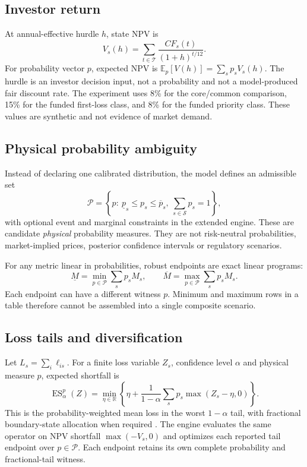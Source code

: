 \documentclass[11pt,a4paper]{article}
\begin{document}
\subsection{Investor return}

At annual-effective hurdle \(h\), state NPV is
\begin{equation}
V_s(h)=\sum_{t\in\mathcal T}\frac{CF_s(t)}{(1+h)^{t/12}}.
\label{eq:npv}
\end{equation}
For probability vector \(p\), expected NPV is \(\mathbb E_p[V(h)]=\sum_s p_sV_s(h)\). The hurdle is an investor decision input, not a probability and not a model-produced fair discount rate. The experiment uses 8\% for the core/common comparison, 15\% for the funded first-loss class, and 8\% for the funded priority class. These values are synthetic and not evidence of market demand.

\subsection{Physical probability ambiguity}

Instead of declaring one calibrated distribution, the model defines an admissible set
\begin{equation}
\mathcal P=\left\{p:\ \underline p_s\le p_s\le\overline p_s,\ \sum_{s\in\mathcal S}p_s=1\right\},
\label{eq:polytope}
\end{equation}
with optional event and marginal constraints in the extended engine. These are candidate \emph{physical} probability measures. They are not risk-neutral probabilities, market-implied prices, posterior confidence intervals or regulatory scenarios.

For any metric linear in probabilities, robust endpoints are exact linear programs:
\begin{equation}
\underline M=\min_{p\in\mathcal P}\sum_s p_sM_s,
\qquad
\overline M=\max_{p\in\mathcal P}\sum_s p_sM_s.
\end{equation}
Each endpoint can have a different witness \(p\). Minimum and maximum rows in a table therefore cannot be assembled into a single composite scenario.

\subsection{Loss tails and diversification}

Let \(L_s=\sum_i\ell_{is}\). For a finite loss variable \(Z_s\), confidence level \(\alpha\) and physical measure \(p\), expected shortfall is
\begin{equation}
\operatorname{ES}^{p}_{\alpha}(Z)
=\min_{\eta\in\mathbb R}\left\{\eta+\frac{1}{1-\alpha}
\sum_s p_s\max(Z_s-\eta,0)\right\}.
\label{eq:es}
\end{equation}
This is the probability-weighted mean loss in the worst \(1-\alpha\) tail, with fractional boundary-state allocation when required \citep{rockafellar2000cvar}. The engine evaluates the same operator on NPV shortfall \(\max(-V_s,0)\) and optimizes each reported tail endpoint over \(p\in\mathcal P\). Each endpoint retains its own complete probability and fractional-tail witness.
\end{document}
